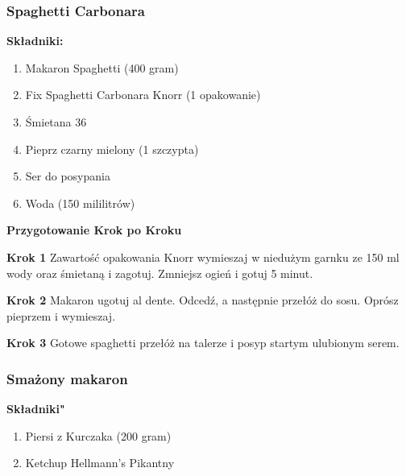\documentclass[12pt, letterpaper, titlepage]{article}
\begin{document}
\subsubsection{Spaghetti Carbonara}
\textbf{Składniki:}
\begin{enumerate}
\item Makaron Spaghetti (400 gram)
\item Fix Spaghetti Carbonara Knorr (1 opakowanie)
\item Śmietana 36%
\item Pieprz czarny mielony (1 szczypta)
\item Ser do posypania
\item Woda (150 mililitrów)
\end{enumerate}
\begin{center}
\textbf{Przygotowanie Krok po Kroku}
\end{center}
\begin{flushleft}
\textbf{Krok 1}
Zawartość opakowania Knorr wymieszaj w niedużym garnku ze 150 ml wody oraz śmietaną i zagotuj. Zmniejsz ogień i gotuj 5 minut.
\end{flushleft}
\begin{flushleft}
\textbf{Krok 2}
Makaron ugotuj al dente. Odcedź, a następnie przełóż do sosu. Oprósz pieprzem i wymieszaj.
\end{flushleft}
\begin{flushleft}
\textbf{Krok 3}
Gotowe spaghetti przełóż na talerze i posyp startym ulubionym serem.
\end{flushleft}
\newpage
\subsubsection{Smażony makaron}
\begin{flushleft}
\textbf{Składniki"}
\end{flushleft}
\begin{enumerate}
\item Piersi z Kurczaka (200 gram)
\item Ketchup Hellmann's Pikantny
\end{enumerate}
\end{document}
